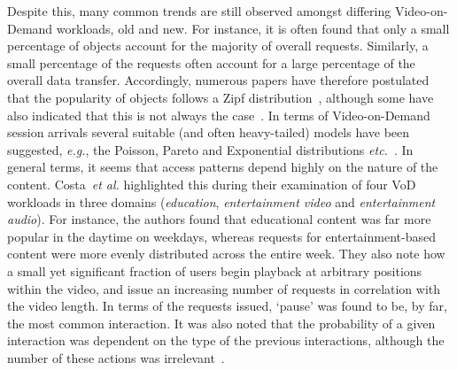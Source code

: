 \documentclass[a4paper,11pt]{article}
\begin{document}
Despite this, many common trends are still observed amongst differing Video-on-Demand workloads, old and new. For instance, it is often found that only a small percentage of objects account for the majority of overall requests. Similarly, a small percentage of the requests often account for a large percentage of the overall data transfer. Accordingly, numerous papers have therefore postulated that the popularity of objects follows a Zipf distribution~\cite{Costa04Analyzing,Tang03MediSyn,Chesire01Measurement,Sripanidkulchai04Analysis}, although some have also indicated that this is not always the case~\cite{Cherkasova02Characterizing,Acharya00Characterizing}.
%
In terms of Video-on-Demand session arrivals several suitable (and often heavy-tailed) models have been suggested, \emph{e.g.}, the Poisson, Pareto and Exponential distributions \emph{etc.}~\cite{Almeida01Analysis}. In general terms, it seems that access patterns depend highly on the nature of the content. Costa~\emph{et al.} highlighted this during their examination of four VoD workloads in three domains (\emph{education}, \emph{entertainment video} and \emph{entertainment audio}). For instance, the authors found that educational content was far more popular in the daytime on weekdays, whereas requests for entertainment-based content were more evenly distributed across the entire week. They also note how a small yet significant fraction of users begin playback at arbitrary positions within the video, and issue an increasing number of requests in correlation with the video length. In terms of the requests issued, `pause' was found to be, by far, the most common interaction. It was also noted that the probability of a given interaction was dependent on the type of the previous interactions, although the number of these actions was irrelevant~\cite{Costa04Analyzing}.

%
%
%
%
\end{document}
